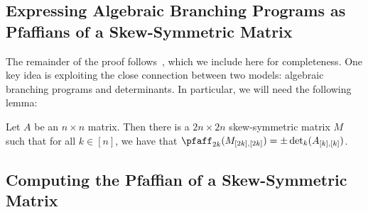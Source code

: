 \documentclass[letterpaper, 11pt]{amsart}
\begin{document}
\subsection{Expressing Algebraic Branching Programs as Pfaffians of a Skew-Symmetric Matrix}

The remainder of the proof follows~\cite{AF21}, which we include here for completeness.
One key idea is exploiting the close connection between two models: algebraic branching programs and determinants.
In particular, we will need the following lemma:

\begin{lem}[{\cite[Lemma 4.3]{AF21}}]\label{lem:skew_symmetrization}
  Let $A$ be an $n\times n$ matrix.
  Then there is a $2n \times 2n$ skew-symmetric matrix $M$ such that for all $k \in [n]$, we have that $\pfaff_{2k}(M_{[2k], [2k]}) = \pm \det_k(A_{[k], [k]})$.
\end{lem}

\subsection{Computing the Pfaffian of a Skew-Symmetric Matrix}
\end{document}
